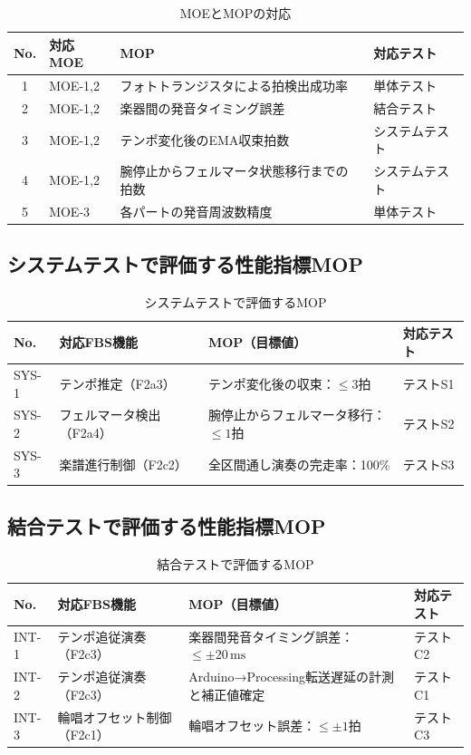 \begin{table}[H]
  \centering
  \begin{tabularx}{\linewidth}{clXl}
    \toprule
    No. & 対応MOE & MOP & 対応テスト \\
    \midrule
    1 & MOE-1,2 & フォトトランジスタによる拍検出成功率 & 単体テスト \\
    2 & MOE-1,2 & 楽器間の発音タイミング誤差 & 結合テスト \\
    3 & MOE-1,2 & テンポ変化後のEMA収束拍数 & システムテスト \\
    4 & MOE-1,2 & 腕停止からフェルマータ状態移行までの拍数 & システムテスト \\
    5 & MOE-3   & 各パートの発音周波数精度 & 単体テスト \\
    \bottomrule
  \end{tabularx}
  \caption{MOEとMOPの対応}
  \label{tab:moe-mop}
\end{table}

\subsection{システムテストで評価する性能指標MOP}

\begin{table}[H]
  \centering
  \begin{tabularx}{\linewidth}{llXl}
    \toprule
    No. & 対応FBS機能 & MOP（目標値） & 対応テスト \\
    \midrule
    SYS-1 & テンポ推定（F2a3） &
      テンポ変化後の収束：$\leq 3$拍 & テストS1 \\
    SYS-2 & フェルマータ検出（F2a4） &
      腕停止からフェルマータ移行：$\leq 1$拍 & テストS2 \\
    SYS-3 & 楽譜進行制御（F2c2） &
      全区間通し演奏の完走率：100\% & テストS3 \\
    \bottomrule
  \end{tabularx}
  \caption{システムテストで評価するMOP}
  \label{tab:mop-sys}
\end{table}

\subsection{結合テストで評価する性能指標MOP}

\begin{table}[H]
  \centering
  \begin{tabularx}{\linewidth}{llXl}
    \toprule
    No. & 対応FBS機能 & MOP（目標値） & 対応テスト \\
    \midrule
    INT-1 & テンポ追従演奏（F2c3） &
      楽器間発音タイミング誤差：$\leq \pm 20\,\mathrm{ms}$ & テストC2 \\
    INT-2 & テンポ追従演奏（F2c3） &
      Arduino→Processing転送遅延の計測と補正値確定 & テストC1 \\
    INT-3 & 輪唱オフセット制御（F2c1） &
      輪唱オフセット誤差：$\leq \pm 1$拍 & テストC3 \\
    \bottomrule
  \end{tabularx}
  \caption{結合テストで評価するMOP}
  \label{tab:mop-int}
\end{table}

